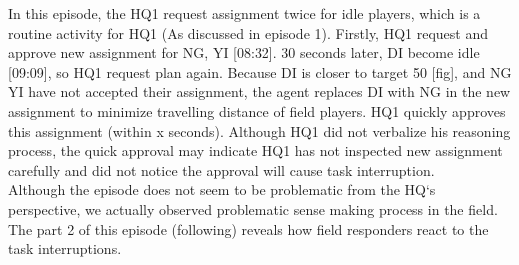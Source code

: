 \noindent{} 


In this episode, the HQ1 request assignment twice for idle players, which is a routine activity for HQ1 (As discussed in episode 1). Firstly, HQ1 request and approve new assignment for NG, YI [08:32]. 30 seconds later, DI become idle [09:09], so HQ1 request plan again. Because DI is closer to target 50 [fig], and NG YI have not accepted their assignment, the agent replaces DI with NG in the new assignment to minimize travelling distance of field players.  HQ1 quickly approves this assignment (within x seconds). Although HQ1 did not verbalize his reasoning process, the quick approval may indicate HQ1 has not inspected new assignment carefully and did not notice the approval will cause task interruption.\\

Although the episode does not seem to be problematic from the HQ`s perspective, we actually observed problematic sense making process in the field. The part 2 of this episode (following) reveals how field responders react to the task interruptions.\\


